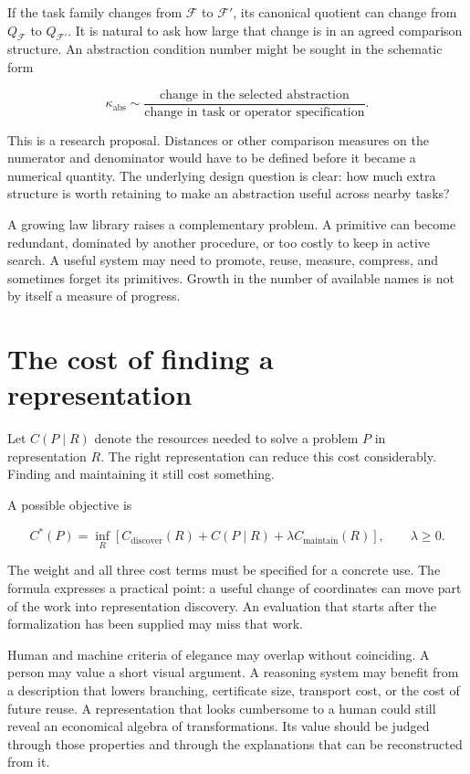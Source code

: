 \documentclass[11pt,oneside,openany]{book}
\begin{document}
If the task family changes from \(\mathcal F\) to \(\mathcal F'\), its canonical quotient can change from \(Q_{\mathcal F}\) to \(Q_{\mathcal F'}\). It is natural to ask how large that change is in an agreed comparison structure. An abstraction condition number might be sought in the schematic form

\[
\kappa_{\mathrm{abs}}\sim
\frac{\text{change in the selected abstraction}}
{\text{change in task or operator specification}}.
\]

This is a research proposal. Distances or other comparison measures on the numerator and denominator would have to be defined before it became a numerical quantity. The underlying design question is clear: how much extra structure is worth retaining to make an abstraction useful across nearby tasks?

A growing law library raises a complementary problem. A primitive can become redundant, dominated by another procedure, or too costly to keep in active search. A useful system may need to promote, reuse, measure, compress, and sometimes forget its primitives. Growth in the number of available names is not by itself a measure of progress.

\section{The cost of finding a representation}
Let \(C(P\mid R)\) denote the resources needed to solve a problem \(P\) in representation \(R\). The right representation can reduce this cost considerably. Finding and maintaining it still cost something.

A possible objective is

\[
C^*(P)=\inf_R\left[
C_{\mathrm{discover}}(R)+C(P\mid R)
+\lambda C_{\mathrm{maintain}}(R)
\right],\qquad\lambda\geq0.
\]

The weight and all three cost terms must be specified for a concrete use. The formula expresses a practical point: a useful change of coordinates can move part of the work into representation discovery. An evaluation that starts after the formalization has been supplied may miss that work.

Human and machine criteria of elegance may overlap without coinciding. A person may value a short visual argument. A reasoning system may benefit from a description that lowers branching, certificate size, transport cost, or the cost of future reuse. A representation that looks cumbersome to a human could still reveal an economical algebra of transformations. Its value should be judged through those properties and through the explanations that can be reconstructed from it.
\end{document}

